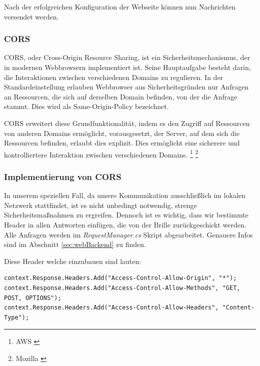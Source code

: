 \begin{itemize}
Nach der erfolgreichen Konfiguration der Webseite können nun Nachrichten versendet werden.

\subsubsection{\label{sec:cors}CORS}
CORS, oder Cross-Origin Resource Sharing, ist ein Sicherheitsmechanismus, der in modernen Webbrowsern implementiert ist. Seine Hauptaufgabe besteht darin, die Interaktionen zwischen verschiedenen Domains zu regulieren. In der Standardeinstellung erlauben Webbrowser aus Sicherheitsgründen nur Anfragen an Ressourcen, die sich auf derselben Domain befinden, von der die Anfrage stammt. Dies wird als Same-Origin-Policy bezeichnet.

CORS erweitert diese Grundfunktionalität, indem es den Zugriff auf Ressourcen von anderen Domains ermöglicht, vorausgesetzt, der Server, auf dem sich die Ressourcen befinden, erlaubt dies explizit. Dies ermöglicht eine sicherere und kontrolliertere Interaktion zwischen
verschiedenen Domains. \footnote{AWS \cite{CORS}} \footnote{Mozilla \cite{CORS-2}}

\subsubsection*{Implementierung von CORS}
In unserem speziellen Fall, da unsere Kommunikation ausschließlich im lokalen Netzwerk stattfindet, ist es nicht unbedingt notwendig, strenge Sicherheitsmaßnahmen zu ergreifen. Dennoch ist es wichtig, dass wir bestimmte Header in allen Antworten einfügen, die von der Brille zurückgeschickt werden. Alle Anfragen werden im \textit{RequestManager.cs} Skript abgearbeitet. Genauere Infos sind im Abschnitt \ref{sec:webBackend} zu finden.

Diese Header welche einzubauen sind lauten:

\begin{lstlisting}[style=csharp, label=code:CORS anfragen]
context.Response.Headers.Add("Access-Control-Allow-Origin", "*");
context.Response.Headers.Add("Access-Control-Allow-Methods", "GET, POST, OPTIONS");
context.Response.Headers.Add("Access-Control-Allow-Headers", "Content-Type");
\end{lstlisting}


\end{itemize}
